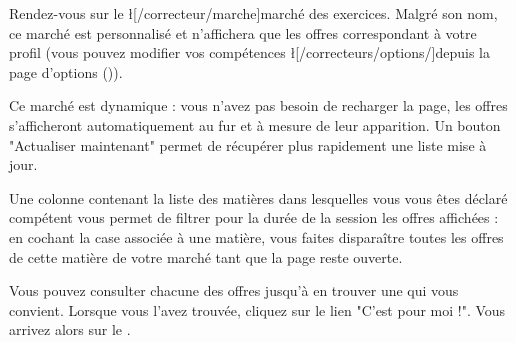 ﻿Rendez-vous sur le \l[/correcteur/marche]{marché des exercices}. Malgré son nom, ce marché est personnalisé et n'affichera que les offres correspondant à votre profil (vous pouvez modifier vos compétences \l[/correcteurs/options/]{depuis la page d'options} ()).

Ce marché est dynamique : vous n'avez pas besoin de recharger la page, les offres s'afficheront automatiquement au fur et à mesure de leur apparition. Un bouton "Actualiser maintenant" permet de récupérer plus rapidement une liste mise à jour.

Une colonne contenant la liste des matières dans lesquelles vous vous êtes déclaré compétent vous permet de filtrer pour la durée de la session les offres affichées : en cochant la case associée à une matière, vous faites disparaître toutes les offres de cette matière de votre marché tant que la page reste ouverte.

Vous pouvez consulter chacune des offres jusqu'à en trouver une qui vous convient.
Lorsque vous l'avez trouvée, cliquez sur le lien "C'est pour moi !".
Vous arrivez alors sur le .